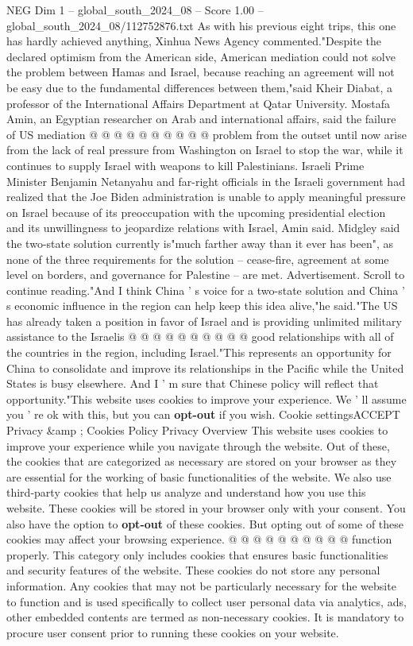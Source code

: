 \begin{textsample}{NEG Dim 1 – global\_south\_2024\_08 – Score 1.00 – global\_south\_2024\_08/112752876.txt}
As with his previous eight trips, this one has hardly achieved anything, Xinhua News Agency commented."Despite the declared optimism from the American side, American mediation could not solve the problem between Hamas and Israel, because reaching an agreement will not be easy due to the fundamental differences between them,"said Kheir Diabat, a professor of the International Affairs Department at Qatar University.
Mostafa Amin, an Egyptian researcher on Arab and international affairs, said the failure of US mediation @ @ @ @ @ @ @ @ @ @ problem from the outset until now arise from the lack of real pressure from Washington on Israel to stop the war, while it continues to supply Israel with weapons to kill Palestinians.
Israeli Prime Minister Benjamin Netanyahu and far-right officials in the Israeli government had realized that the Joe Biden administration is unable to apply meaningful pressure on Israel because of its preoccupation with the upcoming presidential election and its unwillingness to jeopardize relations with Israel, Amin said.
Midgley said the two-state solution currently is"much farther away than it ever has been", as none of the three requirements for the solution -- cease-fire, agreement at some level on borders, and governance for Palestine -- are met.
Advertisement.
Scroll to continue reading."And I think China ' s voice for a two-state solution and China ' s economic influence in the region can help keep this idea alive,"he said."The US has already taken a position in favor of Israel and is providing unlimited military assistance to the Israelis @ @ @ @ @ @ @ @ @ @ good relationships with all of the countries in the region, including Israel."This represents an opportunity for China to consolidate and improve its relationships in the Pacific while the United States is busy elsewhere.
And I ' m sure that Chinese policy will reflect that opportunity."This website uses cookies to improve your experience.
We ' ll assume you ' re ok with this, but you can \textbf{opt-out} if you wish.
Cookie settingsACCEPT Privacy \&amp ; Cookies Policy Privacy Overview This website uses cookies to improve your experience while you navigate through the website.
Out of these, the cookies that are categorized as necessary are stored on your browser as they are essential for the working of basic functionalities of the website.
We also use third-party cookies that help us analyze and understand how you use this website.
These cookies will be stored in your browser only with your consent.
You also have the option to \textbf{opt-out} of these cookies.
But opting out of some of these cookies may affect your browsing experience. @ @ @ @ @ @ @ @ @ @ function properly.
This category only includes cookies that ensures basic functionalities and security features of the website.
These cookies do not store any personal information.
Any cookies that may not be particularly necessary for the website to function and is used specifically to collect user personal data via analytics, ads, other embedded contents are termed as non-necessary cookies.
It is mandatory to procure user consent prior to running these cookies on your website.

\end{textsample}
